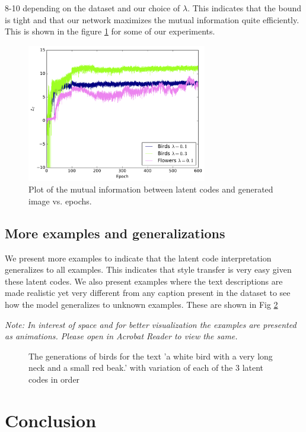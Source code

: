 \documentclass{article}
\begin{document}
8-10 depending on the dataset and our choice of $\lambda$.
This indicates that the bound is tight and that our network maximizes the mutual
information quite efficiently. This is shown in the figure \ref{fig:miplot} for some of our
experiments.
\begin{figure}
\centering
\includegraphics[width=0.7\textwidth]{miplot}
\caption{Plot of the mutual information between latent codes and generated image vs. epochs.}
\label{fig:miplot}
\end{figure}
\subsection{More examples and generalizations}
We present more examples to indicate that the latent code interpretation
generalizes to all examples. This indicates that style transfer is very easy
given these latent codes. We also present examples where the text descriptions
are made realistic yet very different from any caption present in the dataset to
see how the model generalizes to unknown examples. These are shown in Fig
\ref{animation}

\textit{Note: In interest of space and for better visualization the examples are
presented as animations. Please open in Acrobat Reader to view the same.}
\begin{figure}
\caption{The generations of birds for the text 'a white bird with a very long
neck and a small red beak.' with variation of each of the 3 latent codes in
order}
\label{animation}
\end{figure}
\section{Conclusion}
\end{document}
